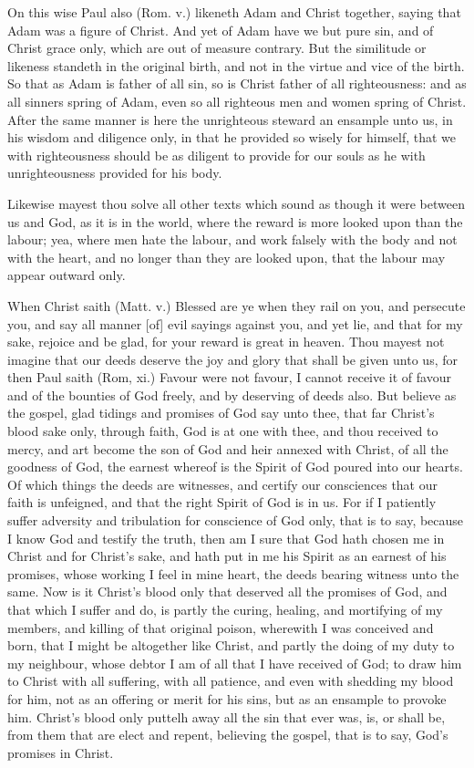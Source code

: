 On this wise Paul also (Rom. v.) likeneth Adam and 
Christ together, saying that Adam was a figure of Christ. 
And yet of Adam have we but pure sin, and of Christ grace 
only, which are out of measure contrary. But the similitude 
or likeness standeth in the original birth, and not in the virtue
and vice of the birth. So that as Adam is father of all 
sin, so is Christ father of all righteousness: and as all sinners 
spring of Adam, even so all righteous men and women 
spring of Christ. After the same manner is here the unrighteous
steward an ensample unto us, in his wisdom and 
diligence only, in that he provided so wisely for himself, 
that we with righteousness should be as diligent to provide 
for our souls as he with unrighteousness provided for his 
body. 

Likewise mayest thou solve all other texts which sound 
as though it were between us and God, as it is in the world, 
where the reward is more looked upon than the labour; 
yea, where men hate the labour, and work falsely with the 
body and not with the heart, and no longer than they are 
looked upon, that the labour may appear outward only. 


When Christ saith (Matt. v.) Blessed are ye when 
they rail on you, and persecute you, and say all manner [of] 
evil sayings against you, and yet lie, and that for my sake, 
rejoice and be glad, for your reward is great in heaven. 
Thou mayest not imagine that our deeds deserve the joy 
and glory that shall be given unto us, for then Paul saith 
(Rom, xi.) Favour were not favour, I cannot receive it of 
favour and of the bounties of God freely, and by deserving 
of deeds also. But believe as the gospel, glad tidings and 
promises of God say unto thee, that far Christ's blood sake 
only, through faith, God is at one with thee, and thou received
to mercy, and art become the son of God and heir 
annexed with Christ, of all the goodness of God, the earnest 
whereof is the Spirit of God poured into our hearts. Of 
which things the deeds are witnesses, and certify our consciences
that our faith is unfeigned, and that the right 
Spirit of God is in us. For if I patiently suffer adversity and 
tribulation for conscience of God only, that is to say, because
I know God and testify the truth, then am I sure 
that God hath chosen me in Christ and for Christ's sake, 
and hath put in me his Spirit as an earnest of his promises, 
whose working I feel in mine heart, the deeds bearing witness
unto the same. Now is it Christ's blood only that deserved
all the promises of God, and that which I suffer and 
do, is partly the curing, healing, and mortifying of my 
members, and killing of that original poison, wherewith I 
was conceived and born, that I might be altogether like 
Christ, and partly the doing of my duty to my neighbour, 
whose debtor I am of all that I have received of God; to 
draw him to Christ with all suffering, with all patience, and 
even with shedding my blood for him, not as an offering 
or merit for his sins, but as an ensample to provoke him. 
Christ's blood only puttelh away all the sin that ever 
was, is, or shall be, from them that are elect and repent, 
believing the gospel, that is to say, God's promises in
Christ. 


